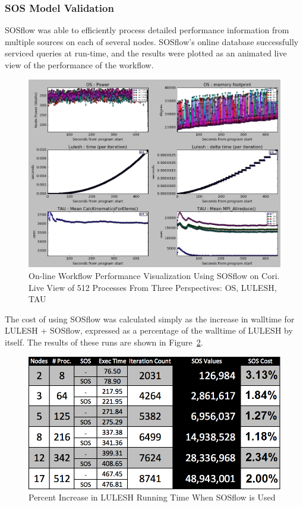 \subsubsection{SOS Model Validation} %
%
SOSflow was able to efficiently process detailed performance
information from multiple sources on each of several nodes.
%
SOSflow's online database successfully serviced queries at run-time, and the
results were plotted as an animated live view of the performance of the
workflow.
%
\begin{figure}[h]
\centering
\includegraphics[width=\columnwidth]{images/512_procs.png}
\caption{On-line Workflow Performance Visualization Using SOSflow on
  Cori.  Live View of 512 Processes From Three Perspectives: OS,
  LULESH, TAU}
\label{cori_visualization}
\end{figure}
%
The cost of using SOSflow was calculated simply as the increase in
walltime for LULESH + SOSflow, expressed as a percentage of the walltime
of LULESH by itself.
%
The results of these runs are shown in Figure~\ref{cori_results}.
%
\begin{figure}[h]
\centering
\includegraphics[width=\columnwidth]{images/cori_results.png}
\caption{Percent Increase in LULESH Running Time When SOSflow is Used}
\label{cori_results}
\end{figure}
%
%

